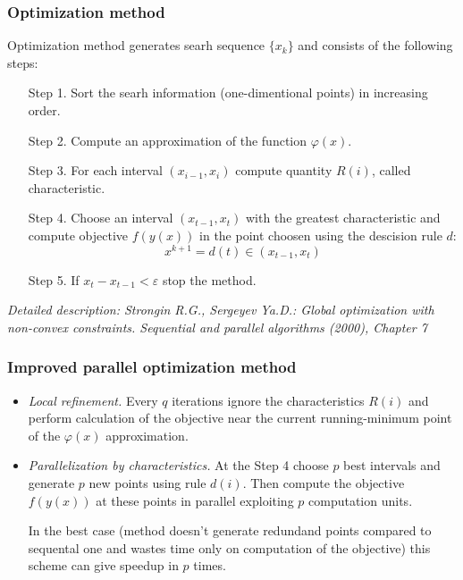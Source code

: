 \documentclass[aspectratio=1610]{beamer}
\begin{document}
\begin{frame}
  \frametitle{Optimization method}
Optimization method generates searh sequence \(\{x_k\}\) and consists of the following steps:
\begin{enumerate}
  \setlength{\itemindent}{.1in}
  \item[Step 1.] Sort the searh information (one-dimentional points) in increasing order.
  \item[Step 2.] Compute an approximation of the function \(\varphi(x)\).
  \item[Step 3.] For each interval \((x_{i-1}, x_i)\) compute quantity \(R(i)\), called characteristic.
  \item[Step 4.] Choose an interval \((x_{t-1}, x_t)\) with the greatest characteristic and
  compute objective \(f(y(x))\) in the point choosen using the descision rule \(d\):
  \begin{displaymath}
    x^{k+1}=d(t)\in (x_{t-1}, x_t)
  \end{displaymath}
  \item[Step 5.] If \(x_{t}-x_{t-1}<\varepsilon\) stop the method.
\end{enumerate}
\textit{\footnotesize	{Detailed description: Strongin R.G., Sergeyev Ya.D.: Global optimization with non-convex constraints. Sequential and parallel algorithms (2000), Chapter 7}}
\end{frame}

\begin{frame}
  \frametitle{Improved parallel optimization method}
  \begin{itemize}
    \item
    \textit{Local refinement.} Every \(q\) iterations ignore the characteristics \(R(i)\)
    and perform calculation of the objective near the current running-minimum point of the \(\varphi(x)\) approximation.
    \item
    \textit{Parallelization by characteristics.} At the Step 4 choose \(p\) best intervals
    and generate \(p\) new points using rule \(d(i)\). Then compute the objective \(f(y(x))\) at these
    points in parallel exploiting \(p\) computation units.

    \enspace
    In the best case (method doesn't generate redundand points compared to sequental
    one and wastes time only on computation of the objective)
    this scheme can give speedup in \(p\) times.
  \end{itemize}

\end{frame}
\end{document}

